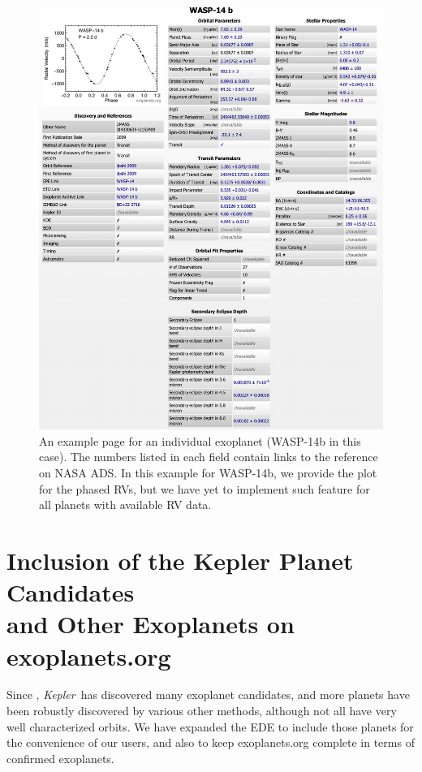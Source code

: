 \documentclass[11pt,preprint]{aastex}
\def\kepler{\textit{Kepler}}
\begin{document}
\begin{CJK*}{UTF8}{gbsn}
\begin{figure}[!htb]
\centering
\includegraphics[width=\textwidth]{../fig/wasp-14b.eps}
\caption{An example page for an individual exoplanet (WASP-14b in this
  case). The numbers listed in each field contain links to the
  reference on NASA ADS. In this example for WASP-14b, we provide the plot
  for the phased RVs, but we have yet to implement such feature for all
  planets with available RV data.}
\label{fig:individual}
\end{figure}


\section{Inclusion of the Kepler Planet Candidates \\
  and Other Exoplanets on exoplanets.org}\label{sec:kepler}

Since \cite{Wright2011}, \kepler\ has discovered many exoplanet
candidates, and more planets have been robustly discovered by various
other methods, although not all have very well characterized orbits.  We have
expanded the EDE to include those planets for the convenience of
our users, and also to keep exoplanets.org complete in terms of confirmed
exoplanets.


\end{CJK*}
\end{document}

